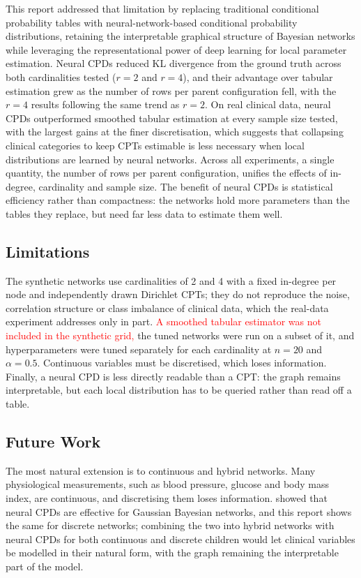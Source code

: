 \documentclass[a4paper,fleqn]{cas-dc}
\newcommand{\provisional}[1]{\textcolor{red}{#1}}
\begin{document}
This report addressed that limitation by replacing traditional conditional probability tables with neural-network-based conditional probability distributions, retaining the interpretable graphical structure of Bayesian networks while leveraging the representational power of deep learning for local parameter estimation. Neural CPDs reduced KL divergence from the ground truth across both cardinalities tested ($r=2$ and $r=4$), and their advantage over tabular estimation grew as the number of rows per parent configuration fell, with the $r=4$ results following the same trend as $r=2$. On real clinical data, neural CPDs outperformed smoothed tabular estimation at every sample size tested, with the largest gains at the finer discretisation, which suggests that collapsing clinical categories to keep CPTs estimable is less necessary when local distributions are learned by neural networks. Across all experiments, a single quantity, the number of rows per parent configuration, unifies the effects of in-degree, cardinality and sample size. The benefit of neural CPDs is statistical efficiency rather than compactness: the networks hold more parameters than the tables they replace, but need far less data to estimate them well.

\subsection{Limitations}

The synthetic networks use cardinalities of 2 and 4 with a fixed in-degree per node and independently drawn Dirichlet CPTs; they do not reproduce the noise, correlation structure or class imbalance of clinical data, which the real-data experiment addresses only in part. \provisional{A smoothed tabular estimator was not included in the synthetic grid,} the tuned networks were run on a subset of it, and hyperparameters were tuned separately for each cardinality at $n=20$ and $\alpha=0.5$. Continuous variables must be discretised, which loses information. Finally, a neural CPD is less directly readable than a CPT: the graph remains interpretable, but each local distribution has to be queried rather than read off a table.

\subsection{Future Work}

The most natural extension is to continuous and hybrid networks. Many physiological measurements, such as blood pressure, glucose and body mass index, are continuous, and discretising them loses information. \citet{Gaogle2026} showed that neural CPDs are effective for Gaussian Bayesian networks, and this report shows the same for discrete networks; combining the two into hybrid networks with neural CPDs for both continuous and discrete children would let clinical variables be modelled in their natural form, with the graph remaining the interpretable part of the model.
\end{document}
